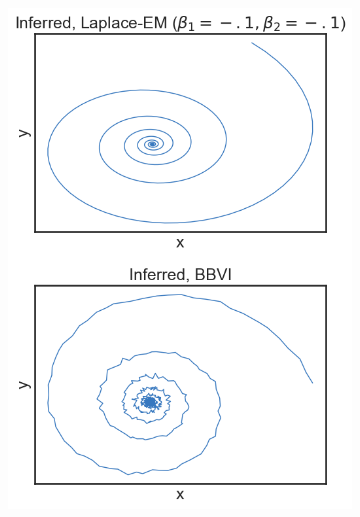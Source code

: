 \begin{figure}
    \begin{subfigure}[b]{0.333\linewidth}
        \centering
        \includegraphics[width=\linewidth]{./Figures/bautin-stable.png}
        \caption{}
        \label{bautinresults:a}
        \vspace{4ex}
    \end{subfigure}%
    \begin{subfigure}[b]{0.309\linewidth}
        \centering

\end{subfigure}
\end{figure}
